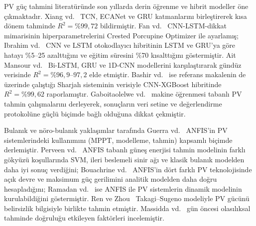 \documentclass[11pt,a4paper]{article}
\begin{document}
PV güç tahmini literatüründe son yıllarda derin öğrenme ve hibrit modeller öne çıkmaktadır. Xiang vd.~\cite{xiang2024} TCN, ECANet ve GRU katmanlarını birleştirerek kısa dönem tahminde $R^2=\%99{,}72$ bildirmiştir. Fan vd.~\cite{fan2024} CNN-LSTM-dikkat mimarisinin hiperparametrelerini Crested Porcupine Optimizer ile ayarlamış; Ibrahim vd.~\cite{ibrahim2024} CNN ve LSTM otokodlayıcı hibritinin LSTM ve GRU'ya göre hatayı \%5–25 azalttığını ve eğitim süresini \%70 kısalttığını göstermiştir. Ait Mansour vd.~\cite{aitmansour2024} Bi-LSTM, GRU ve 1D-CNN modellerini karşılaştırarak gündüz verisinde $R^2=\%96{,}9$–$97{,}2$ elde etmiştir. Bashir vd.~\cite{bashir2024} ise referans makalenin de üzerinde çalıştığı Sharjah sisteminin verisiyle CNN-XGBoost hibritinde $R^2=\%99{,}62$ raporlamıştır. Gaboitaolelwe vd.~\cite{gaboitaolelwe2023} makine öğrenmesi tabanlı PV tahmin çalışmalarını derleyerek, sonuçların veri setine ve değerlendirme protokolüne güçlü biçimde bağlı olduğuna dikkat çekmiştir.

Bulanık ve nöro-bulanık yaklaşımlar tarafında Guerra vd.~\cite{guerra2024} ANFIS'in PV sistemlerindeki kullanımını (MPPT, modelleme, tahmin) kapsamlı biçimde derlemiştir. Perveen vd.~\cite{perveen2019} ANFIS tabanlı güneş enerjisi tahmin modelinin farklı gökyüzü koşullarında SVM, ileri beslemeli sinir ağı ve klasik bulanık modelden daha iyi sonuç verdiğini; Bouachrine vd.~\cite{bouachrine2023} ANFIS'in dört farklı PV teknolojisinde açık devre ve maksimum güç gerilimini analitik modelden daha doğru hesapladığını; Ramadan vd.~\cite{ramadan2022} ise ANFIS ile PV sistemlerin dinamik modelinin kurulabildiğini göstermiştir. Ren ve Zhou~\cite{ren2024} Takagi–Sugeno modeliyle PV gücünü belirsizlik bilgisiyle birlikte tahmin etmiştir. Massidda vd.~\cite{massidda2024} gün öncesi olasılıksal tahminde doğruluğu etkileyen faktörleri incelemiştir.
\end{document}
